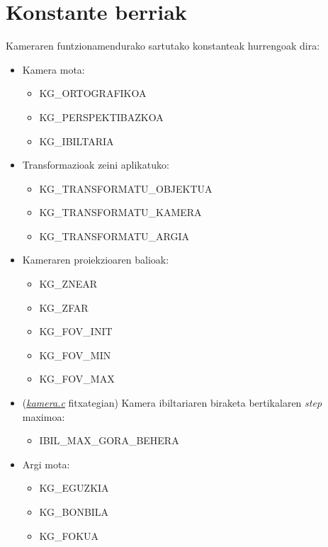 \documentclass[12pt]{article}
\newcommand{\fitxategi}[1] {\underline{\textit{#1}}}
\begin{document}
\section{Konstante berriak}\label{constants}

Kameraren funtzionamendurako sartutako konstanteak hurrengoak dira:

\begin{itemize}
\item Kamera mota:
\begin{itemize}
\item KG\_ORTOGRAFIKOA
\item KG\_PERSPEKTIBAZKOA
\item KG\_IBILTARIA
\end{itemize}

\item Transformazioak zeini aplikatuko:
\begin{itemize}
\item KG\_TRANSFORMATU\_OBJEKTUA
\item KG\_TRANSFORMATU\_KAMERA
\item KG\_TRANSFORMATU\_ARGIA
\end{itemize}

\item Kameraren proiekzioaren balioak:
\begin{itemize}
\item KG\_ZNEAR
\item KG\_ZFAR
\item KG\_FOV\_INIT
\item KG\_FOV\_MIN
\item KG\_FOV\_MAX
\end{itemize}

\item (\fitxategi{kamera.c} fitxategian) Kamera ibiltariaren biraketa bertikalaren \textit{step} maximoa:
\begin{itemize}
\item IBIL\_MAX\_GORA\_BEHERA
\end{itemize}

\item Argi mota:
\begin{itemize}
\item KG\_EGUZKIA
\item KG\_BONBILA
\item KG\_FOKUA
\end{itemize}

\end{itemize}
\end{document}
